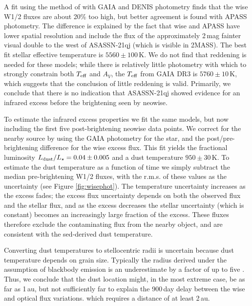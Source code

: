 \documentclass[sn-nature,oneside]{sn-jnl}%
\newcommand{\asas}{ASASSN-21qj}
\begin{document}
A fit using the method of \cite{2019MNRAS.488.3588Y} with GAIA and DENIS photometry finds that the \gls{wise} W1/2 fluxes are about 20\% too high, but better agreement is found with APASS photometry.
%
The difference is explained by the fact that \gls{wise} and APASS have lower spatial resolution and include the flux of the approximately 2\,mag fainter visual double to the west of \asas{} (which is visible in 2MASS).
%
The best fit stellar effective temperature is $5560 \pm 100$\,K.
%
We do not find that reddening is needed for these models; while there is relatively little photometry with which to strongly constrain both $T_{\rm eff}$ and $A_V$, the $T_{\rm eff}$ from GAIA DR3 is $5760 \pm 10$\,K, which suggests that the conclusion of little reddening is valid.
%
Primarily, we conclude that there is no indication that \asas{} showed evidence for an infrared excess before the brightening seen by \gls{neowise}.

To estimate the infrared excess properties we fit the same models, but now including the first five post-brightening \gls{neowise} data points.
%
We correct for the nearby source by using the GAIA photometry for the star, and the post/pre-brightening difference for the \gls{wise} excess flux.
%
This fit yields the fractional luminosity $L_{\rm dust}/L_\star = 0.04 \pm 0.005$ and a dust temperature $950 \pm 30$\,K.
%
To estimate the dust temperature as a function of time we simply subtract the median pre-brightening W1/2 fluxes, with the r.m.s. of these values as the uncertainty (see Figure \ref{fig:wisephot}).
%
The temperature uncertainty increases as the excess fades; the excess flux uncertainty depends on both the observed flux and the stellar flux, and as the excess decreases the stellar uncertainty (which is constant) becomes an increasingly large fraction of the excess.
%
These fluxes therefore exclude the contaminating flux from the nearby object, and are consistent with the  \gls{sed}-derived dust temperature.

Converting dust temperatures to stellocentric radii is uncertain because dust temperature depends on grain size.
%
Typically the radius derived under the assumption of blackbody emission is an underestimate by a factor of up to five \citep{2013MNRAS.428.1263B,2015MNRAS.454.3207P}.
%
Thus, we conclude that the dust location might, in the most extreme case, be as far as 1\,au, but not sufficiently far to explain the 900\,day delay between the \gls{wise} and optical flux variations. which requires a distance of at least 2\,au.
\end{document}
